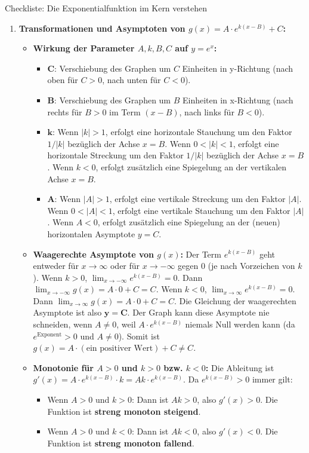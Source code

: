 \begin{loesungsumgebung}{Checkliste: Die Exponentialfunktion im Kern verstehen}
\begin{enumerate}[label=(\alph*)]
    \item \textbf{Transformationen und Asymptoten von $g(x) = A \cdot e^{k(x-B)} + C$:}
    \begin{itemize}
        \item \textbf{Wirkung der Parameter $A, k, B, C$ auf $y=e^x$:}
        \begin{itemize}
            \item $\mathbf{C}$: Verschiebung des Graphen um $C$ Einheiten in y-Richtung (nach oben für $C>0$, nach unten für $C<0$).
            \item $\mathbf{B}$: Verschiebung des Graphen um $B$ Einheiten in x-Richtung (nach rechts für $B>0$ im Term $(x-B)$, nach links für $B<0$).
            \item $\mathbf{k}$:
            Wenn $|k|>1$, erfolgt eine horizontale Stauchung um den Faktor $1/|k|$ bezüglich der Achse $x=B$.
            Wenn $0<|k|<1$, erfolgt eine horizontale Streckung um den Faktor $1/|k|$ bezüglich der Achse $x=B$.
            Wenn $k<0$, erfolgt zusätzlich eine Spiegelung an der vertikalen Achse $x=B$.
            \item $\mathbf{A}$:
            Wenn $|A|>1$, erfolgt eine vertikale Streckung um den Faktor $|A|$.
            Wenn $0<|A|<1$, erfolgt eine vertikale Stauchung um den Faktor $|A|$.
            Wenn $A<0$, erfolgt zusätzlich eine Spiegelung an der (neuen) horizontalen Asymptote $y=C$.
        \end{itemize}
        \item \textbf{Waagerechte Asymptote von $g(x)$:}
        Der Term $e^{k(x-B)}$ geht entweder für $x \to \infty$ oder für $x \to -\infty$ gegen $0$ (je nach Vorzeichen von $k$).
        Wenn $k>0$, $\lim_{x \to -\infty} e^{k(x-B)} = 0$. Dann $\lim_{x \to -\infty} g(x) = A \cdot 0 + C = C$.
        Wenn $k<0$, $\lim_{x \to \infty} e^{k(x-B)} = 0$. Dann $\lim_{x \to \infty} g(x) = A \cdot 0 + C = C$.
        Die Gleichung der waagerechten Asymptote ist also $\mathbf{y=C}$.
        Der Graph kann diese Asymptote nie schneiden, wenn $A \neq 0$, weil $A \cdot e^{k(x-B)}$ niemals Null werden kann (da $e^{\text{Exponent}} > 0$ und $A \neq 0$). Somit ist $g(x) = A \cdot (\text{ein positiver Wert}) + C \neq C$.
        \item \textbf{Monotonie für $A>0$ und $k>0$ bzw. $k<0$:}
        Die Ableitung ist $g'(x) = A \cdot e^{k(x-B)} \cdot k = Ak \cdot e^{k(x-B)}$.
        Da $e^{k(x-B)} > 0$ immer gilt:
        \begin{itemize}
            \item Wenn $A>0$ und $k>0$: Dann ist $Ak > 0$, also $g'(x) > 0$. Die Funktion ist \textbf{streng monoton steigend}.
            \item Wenn $A>0$ und $k<0$: Dann ist $Ak < 0$, also $g'(x) < 0$. Die Funktion ist \textbf{streng monoton fallend}.
        \end{itemize}
    \end{itemize}


\end{enumerate}
\end{loesungsumgebung}
